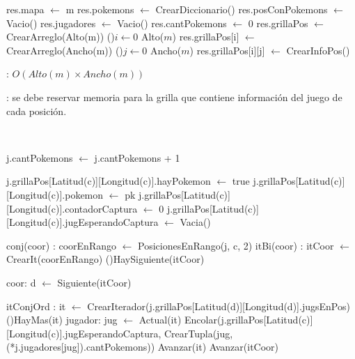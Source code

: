 \begin{Algoritmos}


	\begin{algorithm}[H]
		\NoCaptionOfAlgo
		\caption{}
		res.mapa $\leftarrow$ m
		res.pokemons $\leftarrow$ CrearDiccionario()
		res.posConPokemons $\leftarrow$ Vacio()
		res.jugadores $\leftarrow$ Vacio()
		res.cantPokemons $\leftarrow$ 0
		res.grillaPos $\leftarrow$ CrearArreglo(Alto(m))
		\For(){$i \leftarrow 0$ \KwTo Alto($m$)}{
			res.grillaPos[i] $\leftarrow$ CrearArreglo(Ancho(m))
			\For(){$j \leftarrow 0$ \KwTo Ancho($m$)}{
				res.grillaPos[i][j] $\leftarrow$ CrearInfoPos()
			}
		}
	\end{algorithm}

	\complejidad: $O(Alto(m) \times Ancho(m))$

	\justifcomp: se debe reservar memoria para la grilla que contiene información del juego de cada posición.

	~

	\begin{algorithm}[H]
		\NoCaptionOfAlgo
		\caption{}
		j.cantPokemons $\leftarrow$ j.cantPokemons + 1

		j.grillaPos[Latitud(c)][Longitud(c)].hayPokemon $\leftarrow$ true
		j.grillaPos[Latitud(c)][Longitud(c)].pokemon $\leftarrow$ pk
		j.grillaPos[Latitud(c)][Longitud(c)].contadorCaptura $\leftarrow$ 0
		j.grillaPos[Latitud(c)][Longitud(c)].jugEsperandoCaptura $\leftarrow$ Vacia()

		conj(coor) : coorEnRango $\leftarrow$ PosicionesEnRango(j, c, 2)
		itBi(coor) : itCoor $\leftarrow$ CrearIt(coorEnRango)
		\While(){HaySiguiente(itCoor)}{
			coor: d $\leftarrow$ Siguiente(itCoor)

			itConjOrd : it $\leftarrow$ CrearIterador(j.grillaPos[Latitud(d)][Longitud(d)].jugsEnPos)
			\While(){HayMas(it)}{
				jugador: jug $\leftarrow$ Actual(it)
				Encolar(j.grillaPos[Latitud(c)][Longitud(c)].jugEsperandoCaptura, CrearTupla(jug, (*j.jugadores[jug]).cantPokemons))
				Avanzar(it)
			}
			Avanzar(itCoor)
		}
	\end{algorithm}


\end{Algoritmos}
